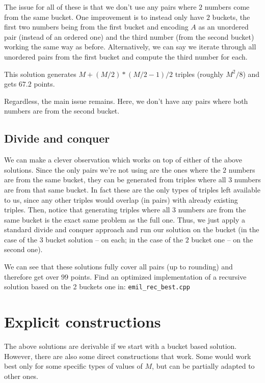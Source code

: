 \documentclass{article}
\begin{document}
The issue for all of these is that we don't use any pairs where $2$ numbers come from the same bucket. One improvement is to instead only have $2$ buckets, the first two numbers being from the first bucket and encoding $A$ as an unordered pair (instead of an ordered one) and the third number (from the second bucket) working the same way as before. Alternatively, we can say we iterate through all unordered pairs from the first bucket and compute the third number for each.

This solution generates $M + (M / 2) * (M / 2 - 1) / 2$ triples (roughly $M^2 / 8$) and gets $67.2$ points.

Regardless, the main issue remains. Here, we don't have any pairs where both numbers are from the second bucket.

\subsection{Divide and conquer}

We can make a clever observation which works on top of either of the above solutions. Since the only pairs we're not using are the ones where the $2$ numbers are from the same bucket, they can be generated from triples where all $3$ numbers are from that same bucket. In fact these are the only types of triples left available to us, since any other triples would overlap (in pairs) with already existing triples. Then, notice that generating triples where all $3$ numbers are from the same bucket is the exact same problem as the full one. Thus, we just apply a standard divide and conquer approach and run our solution on the bucket (in the case of the $3$ bucket solution -- on each; in the case of the $2$ bucket one -- on the second one).

We can see that these solutions fully cover all pairs (up to rounding) and therefore get over $99$ points. Find an optimized implementation of a recursive solution based on the 2 buckets one in: \verb|emil_rec_best.cpp|

\section{Explicit constructions}

The above solutions are derivable if we start with a bucket based solution. However, there are also some direct constructions that work. Some would work best only for some specific types of values of $M$, but can be partially adapted to other ones.
\end{document}
